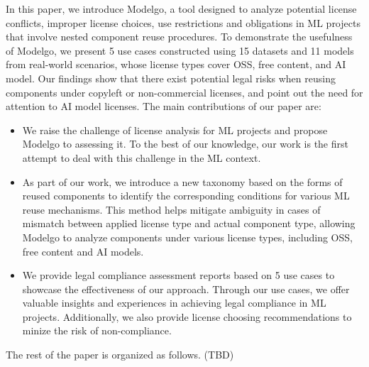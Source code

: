 In this paper, we introduce Modelgo, a tool designed to analyze potential license conflicts, improper license choices, use restrictions and obligations in ML projects that involve nested component reuse procedures.
To demonstrate the usefulness of Modelgo, we present 5 use cases constructed using 15 datasets and 11 models from real-world scenarios, whose license types cover OSS, free content, and AI model.
Our findings show that there exist potential legal risks when reusing  components under copyleft or non-commercial licenses, and point out the need for attention to AI model licenses.
The main contributions of our paper are:
\begin{itemize}
    \item We raise the challenge of license analysis for ML projects and propose Modelgo to assessing it. To the best of our knowledge, our work is the first attempt to deal with this challenge in the ML context.
    \item As part of our work, we introduce a new taxonomy based on the forms of reused components to identify the corresponding conditions for various ML reuse mechanisms. This method helps mitigate ambiguity in cases of mismatch between applied license type and actual component type, allowing Modelgo to analyze components under various license types, including OSS, free content and AI models.
    \item  We provide legal compliance assessment reports based on 5 use cases to showcase the effectiveness of our approach. 
    Through our use cases, we offer valuable insights and experiences in achieving legal compliance in ML projects. 
    Additionally, we also provide license choosing recommendations to minize the risk of non-compliance.
\end{itemize}

The rest of the paper is organized as follows. (TBD)


